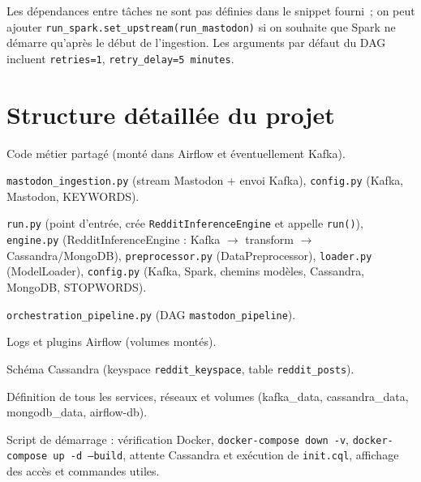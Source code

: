 \documentclass[12pt,a4paper]{article}
\begin{document}
Les dépendances entre tâches ne sont pas définies dans le snippet fourni~; on peut ajouter \texttt{run\_spark.set\_upstream(run\_mastodon)} si on souhaite que Spark ne démarre qu'après le début de l'ingestion. Les arguments par défaut du DAG incluent \texttt{retries=1}, \texttt{retry\_delay=5 minutes}.

\section{Structure détaillée du projet}

\begin{description}[leftmargin=!,labelwidth=\widthof{\texttt{airflow/plugins/}}]
  \item[\texttt{main/}] Code métier partagé (monté dans Airflow et éventuellement Kafka).
  \item[\texttt{main/data\_ingestion/}] \texttt{mastodon\_ingestion.py} (stream Mastodon + envoi Kafka), \texttt{config.py} (Kafka, Mastodon, KEYWORDS).
  \item[\texttt{spark/}] \texttt{run.py} (point d'entrée, crée \texttt{RedditInferenceEngine} et appelle \texttt{run()}), \texttt{engine.py} (RedditInferenceEngine : Kafka $\rightarrow$ transform $\rightarrow$ Cassandra/MongoDB), \texttt{preprocessor.py} (DataPreprocessor), \texttt{loader.py} (ModelLoader), \texttt{config.py} (Kafka, Spark, chemins modèles, Cassandra, MongoDB, STOPWORDS).
  \item[\texttt{airflow/dags/}] \texttt{orchestration\_pipeline.py} (DAG \texttt{mastodon\_pipeline}).
  \item[\texttt{airflow/logs/}, \texttt{airflow/plugins/}] Logs et plugins Airflow (volumes montés).
  \item[\texttt{init.cql}] Schéma Cassandra (keyspace \texttt{reddit\_keyspace}, table \texttt{reddit\_posts}).
  \item[\texttt{docker-compose.yml}] Définition de tous les services, réseaux et volumes (kafka\_data, cassandra\_data, mongodb\_data, airflow-db).
  \item[\texttt{start.sh}] Script de démarrage : vérification Docker, \texttt{docker-compose down -v}, \texttt{docker-compose up -d --build}, attente Cassandra et exécution de \texttt{init.cql}, affichage des accès et commandes utiles.
\end{description}
\end{document}
